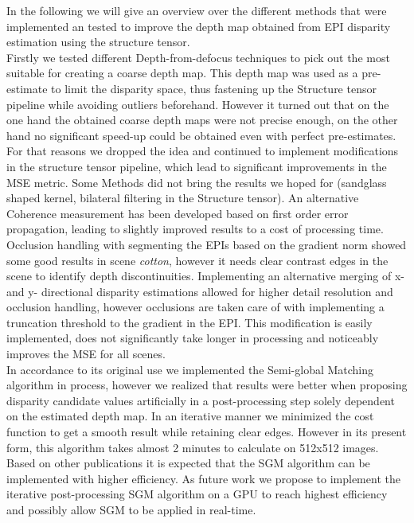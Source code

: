 \documentclass  [
  paper    = a4,
  BCOR     = 10mm,
  twoside,
  fontsize = 12pt,
  fleqn,
  toc      = bibnumbered,
  toc      = listofnumbered,
  numbers  = noendperiod,
  headings = normal,
  listof   = leveldown,
  version  = 3.03
]                                       {scrreprt}
\begin{document}
In the following we will give an overview over the different methods that were implemented an tested to improve the depth map obtained from EPI disparity estimation using the structure tensor.\\
Firstly we tested different Depth-from-defocus techniques to pick out the most suitable for creating a coarse depth map. This depth map was used as a pre-estimate to limit the disparity space, thus fastening up the Structure tensor pipeline while avoiding outliers beforehand. However it turned out that on the one hand the obtained coarse depth maps were not precise enough, on the other hand no significant speed-up could be obtained even with perfect pre-estimates. For that reasons we dropped the idea and continued to implement modifications in the structure tensor pipeline, which lead to significant improvements in the MSE metric. Some Methods did not bring the results we hoped for (sandglass shaped kernel, bilateral filtering in the Structure tensor).
An alternative Coherence measurement has been developed based on first order error propagation, leading to slightly improved results to a cost of processing time. Occlusion handling with segmenting the EPIs based on the gradient norm showed some good results in scene \textit{cotton}, however it needs clear contrast edges in the scene to identify depth discontinuities. Implementing an alternative merging of x- and y- directional disparity estimations allowed for higher detail resolution and occlusion handling, however occlusions are taken care of with implementing a truncation threshold to the gradient in the EPI. This modification is easily implemented, does not significantly take longer in processing and noticeably improves the MSE for all scenes. \\
In accordance to its original use we implemented the Semi-global Matching algorithm in process, however we realized that results were better when proposing disparity candidate values artificially in a post-processing step solely dependent on the estimated depth map. In an iterative manner we minimized the cost function to get a smooth result while retaining clear edges. However in its present form, this algorithm takes almost 2 minutes to calculate on 512x512 images.
\\
Based on other publications it is expected that the SGM algorithm can be implemented with higher efficiency. As future work we propose to implement the iterative post-processing SGM algorithm on a GPU to reach highest efficiency and possibly allow SGM to be applied in real-time.\\
\end{document}
